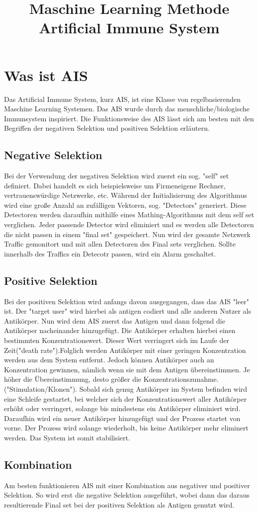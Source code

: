 \documentclass[a4paper,12pt]{article}
\begin{document}
\title{Maschine Learning Methode Artificial Immune System}
\section{Was ist AIS}
Das Artificial Immune System, kurz AIS, ist eine Klasse von regelbasierenden Maschine Learning Systemen. Das AIS wurde durch das menschliche/biologische Immunsystem inspiriert. Die Funktionsweise des AIS lässt sich am besten mit den Begriffen der negativen Selektion und positiven Selektion erläutern.
\subsection{Negative Selektion}
Bei der Verwendung der negativen Selektion wird zuerst ein sog. "self" set definiert. Dabei handelt es sich beispielsweise um Firmeneigene Rechner, vertrauenswürdige Netzwerke, etc. Während der Initialisierung des Algorithmus wird eine große Anzahl an zufälligen Vektoren, sog. "Detectors" generiert. Diese Detectoren werden daraufhin mithilfe eines Mathing-Algorithmus mit dem self set verglichen. Jeder passende Detector wird eliminiert und es werden alle Detectoren die nicht passen in einem "final set" gespeichert. Nun wird der gesamte Netzwerk Traffic gemonitort und mit allen Detectoren des Final sets verglichen. Sollte innerhalb des Traffics ein Detecotr passen, wird ein Alarm geschaltet. 
\subsection{Positive Selektion}
Bei der positiven Selektion wird anfangs davon ausgegangen, dass das AIS "leer" ist. Der "target user" wird hierbei als antigen codiert und alle anderen Nutzer als Antikörper. Nun wird dem AIS zuerst das Antigen und dann folgend die Antikörper nacheinander hinzugefügt. Die Antikörper erhalten hierbei einen bestimmten Konzentrationswert.  Dieser Wert verringert sich im Laufe der Zeit("death rate").Folglich werden Antikörper mit einer geringen Konzentration werden aus dem System entfernt. Jedoch können Antikörper auch an Konzentration gewinnen, nämlich wenn sie mit dem Antigen übereinstimmen. Je höher die Übereinstimmung, desto größer die Konzentrationszunahme.("Stimulation/Klonen"). Sobald sich genug Antikörper im System befinden wird eine Schleife gestartet, bei welcher sich der Konzentrationswert aller Antikörper erhöht oder verringert, solange bis mindestens ein Antikörper eliminiert wird. Daraufhin wird ein neuer Antikörper hinzugefügt und der Prozess startet von vorne. Der Prozess wird solange wiederholt, bis keine Antikörper mehr eliminert werden. Das System ist somit stabilisiert.
\subsection{Kombination}
Am besten funktionieren AIS mit einer Kombination aus negativer und positiver Selektion. So wird erst die negative Selektion ausgeführt, wobei dann das daraus resultierende Final set bei der positiven Selektion als Antigen genutzt wird. 
\end{document}
